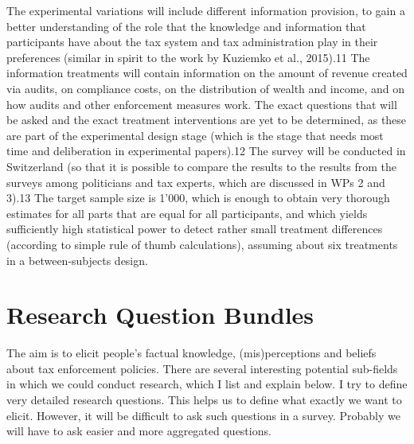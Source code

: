 \documentclass[a4paper, 12pt]{article}
\begin{document}
The experimental variations will include different information provision, to gain a better understanding of the role that  the knowledge and information that participants have about the tax system and tax administration play in their  preferences (similar in spirit to the work by Kuziemko et al., 2015).11 The information treatments will contain information  on the amount of revenue created via audits, on compliance costs, on the distribution of wealth and income, and on how  audits and other enforcement measures work. The exact questions that will be asked and the exact treatment  interventions are yet to be determined, as these are part of the experimental design stage (which is the stage that needs  most time and deliberation in experimental papers).12  The survey will be conducted in Switzerland (so that it is possible to compare the results to the results from the surveys  among politicians and tax experts, which are discussed in WPs 2 and 3).13 The target sample size is 1’000, which is enough to obtain very thorough estimates for all parts that are equal for all participants, and which yields sufficiently high statistical power to detect rather small treatment differences (according to simple rule of thumb calculations), assuming  about six treatments in a between-subjects design.

\section{Research Question Bundles}
The aim is to elicit people's factual knowledge, (mis)perceptions and beliefs about tax enforcement policies. There are several interesting potential sub-fields in which we could conduct research, which I list and explain below. I try to define very detailed research questions. This helps us to define what exactly we want to elicit. However, it will be difficult to ask such questions in a survey. Probably we will have to ask easier and more aggregated questions. 
\end{document}
